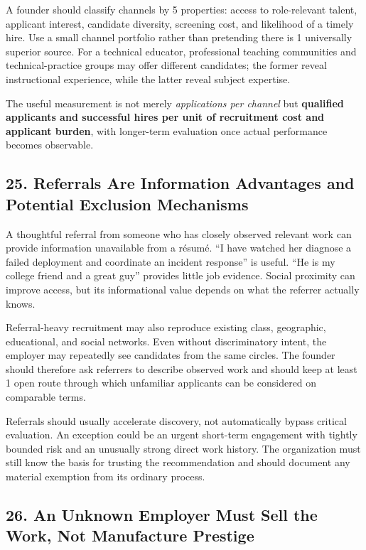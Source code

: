 A founder should classify channels by 5 properties: access to role-relevant talent, applicant interest, candidate diversity, screening cost, and likelihood of a timely hire. Use a small channel portfolio rather than pretending there is 1 universally superior source. For a technical educator, professional teaching communities and technical-practice groups may offer different candidates; the former reveal instructional experience, while the latter reveal subject expertise.

The useful measurement is not merely \textit{applications per channel} but \textbf{qualified applicants and successful hires per unit of recruitment cost and applicant burden}, with longer-term evaluation once actual performance becomes observable.

\subsection*{25. Referrals Are Information Advantages and Potential Exclusion Mechanisms}

A thoughtful referral from someone who has closely observed relevant work can provide information unavailable from a résumé. ``I have watched her diagnose a failed deployment and coordinate an incident response'' is useful. ``He is my college friend and a great guy'' provides little job evidence. Social proximity can improve access, but its informational value depends on what the referrer actually knows.

Referral-heavy recruitment may also reproduce existing class, geographic, educational, and social networks. Even without discriminatory intent, the employer may repeatedly see candidates from the same circles. The founder should therefore ask referrers to describe observed work and should keep at least 1 open route through which unfamiliar applicants can be considered on comparable terms.

Referrals should usually accelerate discovery, not automatically bypass critical evaluation. An exception could be an urgent short-term engagement with tightly bounded risk and an unusually strong direct work history. The organization must still know the basis for trusting the recommendation and should document any material exemption from its ordinary process.

\subsection*{26. An Unknown Employer Must Sell the Work, Not Manufacture Prestige}

